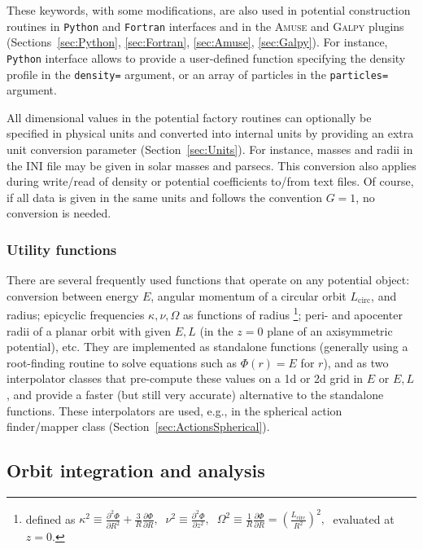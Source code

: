 \documentclass[12pt]{article}
\newcommand{\Amuse}{\textsc{Amuse}\xspace}
\newcommand{\Galpy}{\textsc{Galpy}\xspace}
\newcommand{\Python}{\texttt{Python}\xspace}
\newcommand{\Fortran}{\texttt{Fortran}\xspace}
\newcommand{\ppp}[1]{\textcolor{darkolive} {\texttt{#1}}}
\renewcommand{\d}{\partial}
\begin{document}
These keywords, with some modifications, are also used in potential construction routines in \Python and \Fortran interfaces and in the \Amuse and \Galpy plugins (Sections~\ref{sec:Python}, \ref{sec:Fortran}, \ref{sec:Amuse}, \ref{sec:Galpy}). For instance, \Python interface allows to provide a user-defined function specifying the density profile in the \ppp{density=} argument, or an array of particles in the \ppp{particles=} argument.

All dimensional values in the potential factory routines can optionally be specified in physical units and converted into internal units by providing an extra unit conversion parameter (Section~\ref{sec:Units}). For instance, masses and radii in the INI file may be given in solar masses and parsecs. This conversion also applies during write/read of density or potential coefficients to/from text files. Of course, if all data is given in the same units and follows the convention $G=1$, no conversion is needed.

\subsubsection{Utility functions}  \label{sec:PotentialUtility}

There are several frequently used functions that operate on any potential object: conversion between energy $E$, angular momentum of a circular orbit $L_\mathrm{circ}$, and radius; epicyclic frequencies $\kappa,\nu,\Omega$ as functions of radius%
\footnote{defined as $\displaystyle \kappa^2\equiv \frac{\d^2\Phi}{\d R^2} + \frac 3 R \frac{\d\Phi}{\d R},\;\; \nu^2\equiv \frac{\d^2\Phi}{\d z^2},\;\; \Omega^2\equiv \frac 1 R \frac{\d\Phi}{\d R} = \left(\frac{L_\mathrm{circ}}{R^2}\right)^2,\;$ evaluated at $z=0$.};
peri- and apocenter radii of a planar orbit with given $E,L$ (in the $z=0$ plane of an axisymmetric potential), etc. They are implemented as standalone functions (generally using a root-finding routine to solve equations such as $\Phi(r)=E$ for $r$), and as two interpolator classes that pre-compute these values on a 1d or 2d grid in $E$ or $E,L$, and provide a faster (but still very accurate) alternative to the standalone functions. These interpolators are used, e.g., in the spherical action finder/mapper class (Section~\ref{sec:ActionsSpherical}).


\subsection{Orbit integration and analysis}  \label{sec:Orbits}
\end{document}
